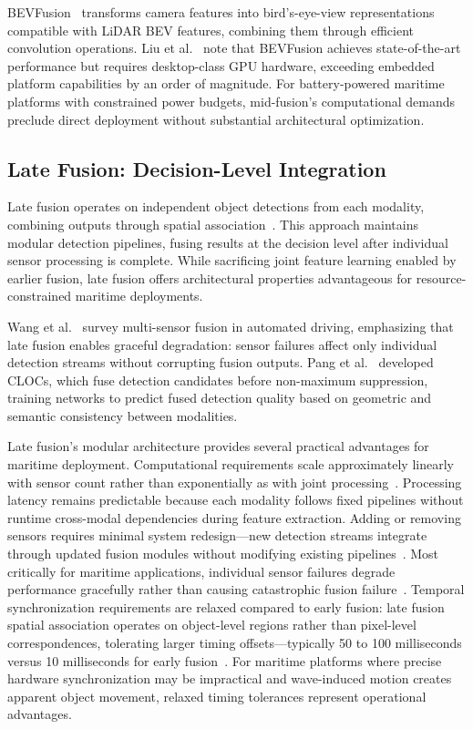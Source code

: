 \documentclass[../main.tex]{subfiles}
\begin{document}
BEVFusion~\cite{liang2022, liu2023b} transforms camera features into bird's-eye-view representations compatible with \ac{LiDAR} BEV features, combining them through efficient convolution operations.
Liu et al.~\cite{liu2023b} note that BEVFusion achieves state-of-the-art performance but requires desktop-class GPU hardware, exceeding embedded platform capabilities by an order of magnitude.
For battery-powered maritime platforms with constrained power budgets, mid-fusion's computational demands preclude direct deployment without substantial architectural optimization.

\subsection{Late Fusion: Decision-Level Integration}

Late fusion operates on independent object detections from each modality, combining outputs through spatial association~\cite{wang2020a, pang2020}.
This approach maintains modular detection pipelines, fusing results at the decision level after individual sensor processing is complete.
While sacrificing joint feature learning enabled by earlier fusion, late fusion offers architectural properties advantageous for resource-constrained maritime deployments.

Wang et al.~\cite{wang2020a} survey multi-sensor fusion in automated driving, emphasizing that late fusion enables graceful degradation: sensor failures affect only individual detection streams without corrupting fusion outputs.
Pang et al.~\cite{pang2020} developed CLOCs, which fuse detection candidates before non-maximum suppression, training networks to predict fused detection quality based on geometric and semantic consistency between modalities.

Late fusion's modular architecture provides several practical advantages for maritime deployment.
Computational requirements scale approximately linearly with sensor count rather than exponentially as with joint processing~\cite{wang2020a}.
Processing latency remains predictable because each modality follows fixed pipelines without runtime cross-modal dependencies during feature extraction.
Adding or removing sensors requires minimal system redesign---new detection streams integrate through updated fusion modules without modifying existing pipelines~\cite{feng2021}.
Most critically for maritime applications, individual sensor failures degrade performance gracefully rather than causing catastrophic fusion failure~\cite{huang2024}.
Temporal synchronization requirements are relaxed compared to early fusion: late fusion spatial association operates on object-level regions rather than pixel-level correspondences, tolerating larger timing offsets---typically 50 to 100 milliseconds versus 10 milliseconds for early fusion~\cite{huang2024}.
For maritime platforms where precise hardware synchronization may be impractical and wave-induced motion creates apparent object movement, relaxed timing tolerances represent operational advantages.
\end{document}
